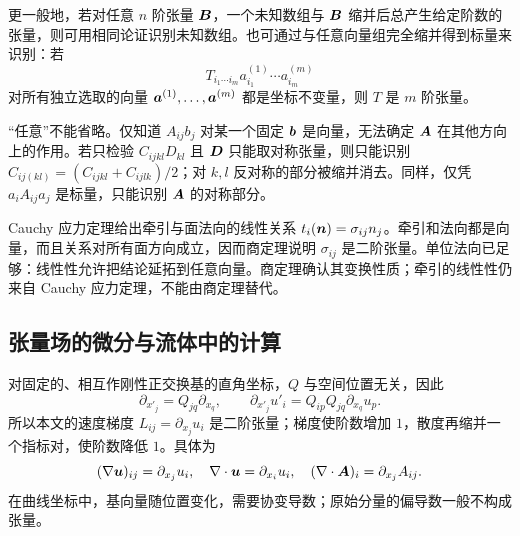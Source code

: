 更一般地，若对任意 $n$ 阶张量 $\bm{B}$，一个未知数组与 $\bm{B}$ 缩并后总产生给定阶数的张量，则可用相同论证识别未知数组。也可通过与任意向量组完全缩并得到标量来识别：若
\begin{equation}
 T_{i_1\cdots i_m}a^{(1)}_{i_1}\cdots a^{(m)}_{i_m}
\end{equation}
对所有独立选取的向量 $\bm{a}^{(1)},\ldots,\bm{a}^{(m)}$ 都是坐标不变量，则 $T$ 是 $m$ 阶张量。

\begin{warningbox}
“任意”不能省略。仅知道 $A_{ij}b_j$ 对某一个固定 $\bm{b}$ 是向量，无法确定 $\bm{A}$ 在其他方向上的作用。若只检验 $C_{ijkl}D_{kl}$ 且 $\bm{D}$ 只能取对称张量，则只能识别 $C_{ij(kl)}=(C_{ijkl}+C_{ijlk})/2$；对 $k,l$ 反对称的部分被缩并消去。同样，仅凭 $a_iA_{ij}a_j$ 是标量，只能识别 $\bm{A}$ 的对称部分。
\end{warningbox}

\begin{example}[应力张量为什么是二阶张量]
Cauchy 应力定理给出牵引与面法向的线性关系 $t_i(\bm{n})=\sigma_{ij}n_j$。牵引和法向都是向量，而且关系对所有面方向成立，因而商定理说明 $\sigma_{ij}$ 是二阶张量。单位法向已足够：线性性允许把结论延拓到任意向量。商定理确认其变换性质；牵引的线性性仍来自 Cauchy 应力定理，不能由商定理替代。
\end{example}

\subsection{张量场的微分与流体中的计算}

对固定的、相互作刚性正交换基的直角坐标，$Q$ 与空间位置无关，因此
\begin{equation}
 \partial_{x'_j}=Q_{jq}\partial_{x_q},\qquad
 \partial_{x'_j}u'_i=Q_{ip}Q_{jq}\partial_{x_q}u_p.
\end{equation}
所以本文的速度梯度 $L_{ij}=\partial_{x_j}u_i$ 是二阶张量；梯度使阶数增加 $1$，散度再缩并一个指标对，使阶数降低 $1$。具体为
\begin{equation}
 (\nabla\bm{u})_{ij}=\partial_{x_j}u_i,\quad
 \nabla\cdot\bm{u}=\partial_{x_i}u_i,\quad
 (\nabla\cdot\bm{A})_i=\partial_{x_j}A_{ij}.
\end{equation}
在曲线坐标中，基向量随位置变化，需要协变导数；原始分量的偏导数一般不构成张量。

